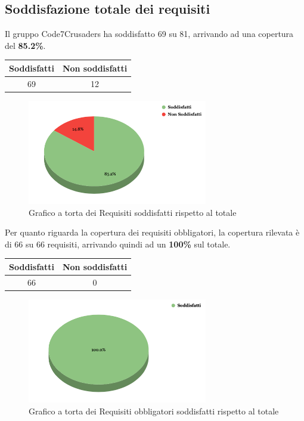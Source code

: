 \subsection{Soddisfazione totale dei requisiti}
Il gruppo Code7Crusaders ha soddisfatto 69 su 81, arrivando ad una copertura del \textbf{85.2\%}.
\begin{center}
\begin{tabular}{|c|c|}
\hline
\textbf{Soddisfatti} & \textbf{Non soddisfatti} \\
\hline
69 & 12 \\
\hline
\end{tabular}
\end{center}
\begin{figure}[H]
    \centering
    \includegraphics[width=0.7\textwidth]{img/RequisitiTotali.png}
    \caption{Grafico a torta dei Requisiti soddisfatti rispetto al totale}
\end{figure}
\newpage
Per quanto riguarda la copertura dei requisiti obbligatori, la copertura rilevata è di 66 su 66 requisiti, arrivando quindi ad un \textbf{100\%} sul totale.
\begin{center}
\begin{tabular}{|c|c|}
\hline
\textbf{Soddisfatti} & \textbf{Non soddisfatti} \\
\hline
66 & 0 \\
\hline
\end{tabular}
\end{center}
\begin{figure}[H]
    \centering
    \includegraphics[width=0.7\textwidth]{img/RequisitiObbligatori.png}
    \caption{Grafico a torta dei Requisiti obbligatori soddisfatti rispetto al totale}
\end{figure}

